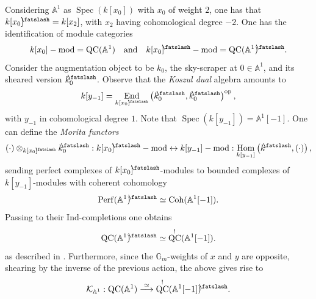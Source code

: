 \documentclass[11pt, a4paper]{amsart}
\numberwithin{equation}{section}
\theoremstyle{definition}
\theoremstyle{remark}
\DeclareMathOperator{\Hom}{Hom}
\DeclareMathOperator{\End}{End}
\DeclareMathOperator{\Spec}{Spec}
\DeclareMathOperator{\Coh}{Coh}
\DeclareMathOperator{\Perf}{Perf}
\DeclareMathOperator{\QC}{QC}
\newcommand{\shear}{{\mathbin{\mkern-6mu\fatslash}}}
\newcommand{\Kk}{\mathcal{K}}
\renewcommand{\AA}{\mathbb{A}}
\newcommand{\GG}{\mathbb{G}}
\renewcommand{\to}{\longrightarrow}
\begin{document}
Considering $\AA^1$ as $\Spec(k[x_0])$ with $x_0$ of weight $2$, one has that $k[x_0]^{\shear} = k[x_2]$, with $x_2$ having cohomological degree $-2$. One has the identification of module categories
\[
k[x_0]-\mathrm{mod} = \QC(\AA^1) \quad \text{and} \quad k[x_0]^{\shear}-\mathrm{mod} = \QC(\AA^1)^{\shear}.
\]
Consider the augmentation object to be $k_0$, the sky-scraper at $0 \in \AA^1$, and its sheared version $k_0^{\shear}$. Observe that the {\it Koszul dual} algebra amounts to
\[
k[y_{-1}] = \End_{k[x_0]^{\shear}}\left ( k_0^{\shear}, k_0^{\shear} \right )^{\mathrm{op}},
\]
with $y_{-1}$ in cohomological degree $1$. Note that $\Spec(k[y_{-1}]) = \AA^1[-1]$. One can define the {\it Morita functors}
\[
(\cdot) \otimes_{k[x_0]^{\shear}} k_0^{\shear} : k[x_0]^{\shear}-\mathrm{mod} \leftrightarrow k[y_{-1}]-\mathrm{mod} : \Hom_{k[y_{-1}]}\left (k^{\shear}, (\cdot) \right ),
\]
sending perfect complexes of $k[x_0]^{\shear}$-modules to bounded complexes of $k[y_{-1}]$-modules with coherent cohomology
\[
\Perf(\AA^1)^\shear \simeq \Coh(\mathbb{A}^1[-1]).
\]
Passing to their $\mathrm{Ind}$-completions one obtains
\[
\QC(\AA^1)^\shear \simeq \QC^!(\mathbb{A}^1[-1]).
\]
as described in \cite[pg. 363]{BZSV}. Furthermore, since the $\GG_m$-weights of $x$ and $y$ are opposite, shearing by the inverse of the previous action, the above gives rise to \cite[pg. 365]{BZSV}
\begin{equation} \label{eq Koszul duality over fibres}
\Kk_{\AA^1} : \QC(\AA^1) \stackrel{\simeq}{\to} \QC^!(\mathbb{A}^1[-1])^\shear.
\end{equation}
\end{document}
